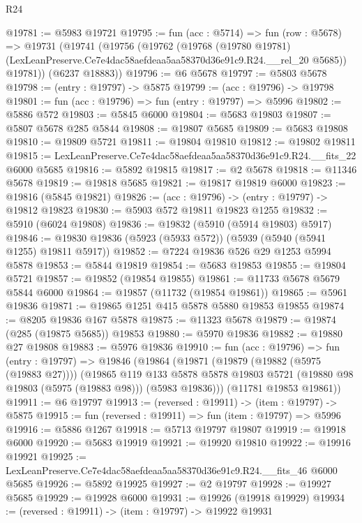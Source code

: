 \begin{lexlean}{R24}
\begin{coremodule}
@19781 := @5983 @19721
@19795 := fun (acc : @5714) =>
  fun (row : @5678) =>
  @19731
    (@19741
      (@19756
        (@19762
          (@19768
            (@19780 @19781)
            (LexLeanPreserve.Ce7e4dac58aefdeaa5aa58370d36e91c9.R24.__rel_20 @5685))
          @19781))
      (@6237 @18883))
@19796 := @6 @5678
@19797 := @5803 @5678
@19798 := (entry : @19797) -> @5875
@19799 := (acc : @19796) -> @19798
@19801 := fun (acc : @19796) => fun (entry : @19797) => @5996
@19802 := @5886 @572
@19803 := @5845 @6000
@19804 := @5683 @19803
@19807 := @5807 @5678 @285 @5844
@19808 := @19807 @5685
@19809 := @5683 @19808
@19810 := @19809 @5721
@19811 := @19804 @19810
@19812 := @19802 @19811
@19815 := LexLeanPreserve.Ce7e4dac58aefdeaa5aa58370d36e91c9.R24.__fits_22 @6000 @5685
@19816 := @5892 @19815
@19817 := @2 @5678
@19818 := @11346 @5678
@19819 := @19818 @5685
@19821 := @19817 @19819 @6000
@19823 := @19816 (@5845 @19821)
@19826 := (acc : @19796) -> (entry : @19797) -> @19812 @19823
@19830 := @5903 @572 @19811 @19823 @1255
@19832 := @5910 (@6024 @19808)
@19836 := @19832 (@5910 (@5914 @19803) @5917)
@19846 := @19830 @19836 (@5923 (@5933 @572)) (@5939 (@5940 (@5941 @1255) @19811 @5917))
@19852 := @7224 @19836 @526 @29 @1253 @5994 @5878
@19853 := @5844 @19819
@19854 := @5683 @19853
@19855 := @19804 @5721
@19857 := @19852 (@19854 @19855)
@19861 := @11733 @5678 @5679 @5844 @6000
@19864 := @19857 (@11732 (@19854 @19861))
@19865 := @5961 @19836
@19871 := @19865 @1251 @415 @5878 @5880 @19853 @19855
@19874 := @8205 @19836 @167 @5878
@19875 := @11323 @5678
@19879 := @19874 (@285 (@19875 @5685)) @19853
@19880 := @5970 @19836
@19882 := @19880 @27 @19808
@19883 := @5976 @19836
@19910 := fun (acc : @19796) =>
  fun (entry : @19797) =>
  @19846
    (@19864
      (@19871
        (@19879 (@19882 (@5975 (@19883 @27))))
        (@19865
          @119
          @133
          @5878
          @5878
          @19803
          @5721
          (@19880 @98 @19803 (@5975 (@19883 @98)))
          (@5983 @19836)))
      (@11781 @19853 @19861))
@19911 := @6 @19797
@19913 := (reversed : @19911) -> (item : @19797) -> @5875
@19915 := fun (reversed : @19911) => fun (item : @19797) => @5996
@19916 := @5886 @1267
@19918 := @5713 @19797 @19807
@19919 := @19918 @6000
@19920 := @5683 @19919
@19921 := @19920 @19810
@19922 := @19916 @19921
@19925 := LexLeanPreserve.Ce7e4dac58aefdeaa5aa58370d36e91c9.R24.__fits_46 @6000 @5685
@19926 := @5892 @19925
@19927 := @2 @19797
@19928 := @19927 @5685
@19929 := @19928 @6000
@19931 := @19926 (@19918 @19929)
@19934 := (reversed : @19911) -> (item : @19797) -> @19922 @19931

\end{coremodule}
\end{lexlean}
